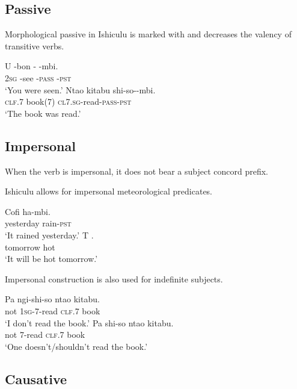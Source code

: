 \subsection{Passive}

Morphological passive in Ishiculu is marked with \textit{} and decreases the valency of transitive verbs.

\begin{exe}
\ex
\gll U {-bon\textramshorns} -\textit{} -mbi. \\
\textsc{2sg} -see -\textsc{pass} -\textsc{pst}  \\
\trans `You were seen.'
\ex
\gll Nta\textbeltl o kitabu shi-so-\textit{}-mbi. \\
\textsc{clf}.7 book(7) \textsc{cl7.sg}-read-\textsc{pass}-\textsc{pst}  \\
\trans `The book was read.'
\end{exe}

\subsection{Impersonal}
When the verb is impersonal, it does not bear a subject concord prefix.

Ishiculu allows for impersonal meteorological predicates.

\begin{exe}
\ex
\gll Cofi ha-mbi. \\
yesterday rain-\textsc{pst} \\
\trans `It rained yesterday.'
\ex
\gll T . \\
tomorrow hot \\
\trans `It will be hot tomorrow.'
\end{exe}

Impersonal construction is also used for indefinite subjects.

\begin{exe}
\ex
\gll Pa ngi-shi-so nta\textbeltl o kitabu. \\
not \textsc{1sg}-\textsc{7}-read \textsc{clf}.7 book \\
\trans `I don't read the book.'
\ex
\gll Pa shi-so nta\textbeltl o kitabu. \\
not \textsc{7}-read \textsc{clf}.7 book \\
\trans `One doesn't/shouldn't read the book.'
\end{exe}

\subsection{Causative}

